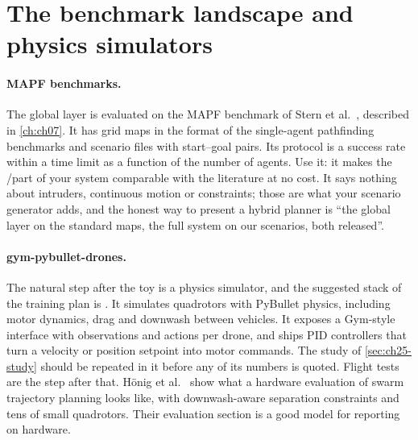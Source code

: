 \section{The benchmark landscape and physics simulators}
\label{sec:ch25-benchmarks}

\paragraph{MAPF benchmarks.}
The global layer is evaluated on the MAPF benchmark of Stern et
al.~\cite{stern2019mapf}, described in \cref{ch:ch07}.
It has grid maps in the  format of the single-agent pathfinding
benchmarks \cite{sturtevant2012benchmarks} and scenario files with
start--goal pairs. Its protocol is a success rate within a time limit as a
function of the number of agents. Use it: it makes the \cbs/\ecbs part of your system
comparable with the literature at no cost. It says nothing about intruders,
continuous motion or constraints; those are what your scenario generator
adds, and the honest way to present a hybrid planner is ``the global layer
on the standard maps, the full system on our scenarios, both released''.

\paragraph{gym-pybullet-drones.}
The natural step after the toy is a physics simulator, and the suggested
stack of the training plan is \allowbreak{}
\cite{panerati2021learning}. It
simulates quadrotors with PyBullet physics, including motor dynamics, drag
and downwash between vehicles. It exposes a Gym-style interface with
observations and actions per drone, and ships PID controllers that turn a
velocity or position setpoint into motor commands. The study of
\cref{sec:ch25-study} should be repeated in it before any of its numbers is
quoted. Flight tests are the step after that. H{\"o}nig et
al.~\cite{honig2018trajectory} show what a hardware evaluation of swarm
trajectory planning looks like, with downwash-aware separation constraints
and tens of small quadrotors. Their evaluation section is a good model
for reporting on hardware.


